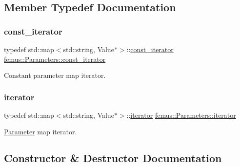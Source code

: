 \subsection{Member Typedef Documentation}
\mbox{\label{classfemus_1_1_parameters_aa561fb692a63fe58dcec20374e9569c2}} 
\subsubsection{\texorpdfstring{const\+\_\+iterator}{const\_iterator}}
{\footnotesize\ttfamily typedef std\+::map$<$std\+::string, Value$\ast$$>$\+::\mbox{\hyperlink{classfemus_1_1_parameters_aa561fb692a63fe58dcec20374e9569c2}{const\+\_\+iterator}} \mbox{\hyperlink{classfemus_1_1_parameters_aa561fb692a63fe58dcec20374e9569c2}{femus\+::\+Parameters\+::const\+\_\+iterator}}}

Constant parameter map iterator. \mbox{\label{classfemus_1_1_parameters_a2cbdfdaaa2d9438d9a6900aa62c8295b}} 
\subsubsection{\texorpdfstring{iterator}{iterator}}
{\footnotesize\ttfamily typedef std\+::map$<$std\+::string, Value$\ast$$>$\+::\mbox{\hyperlink{classfemus_1_1_parameters_a2cbdfdaaa2d9438d9a6900aa62c8295b}{iterator}} \mbox{\hyperlink{classfemus_1_1_parameters_a2cbdfdaaa2d9438d9a6900aa62c8295b}{femus\+::\+Parameters\+::iterator}}}

\mbox{\hyperlink{classfemus_1_1_parameters_1_1_parameter}{Parameter}} map iterator. 

\subsection{Constructor \& Destructor Documentation}
\mbox{\label{classfemus_1_1_parameters_a8dd2d29d6b1c5adb6584cb6a271b7f24}} 
